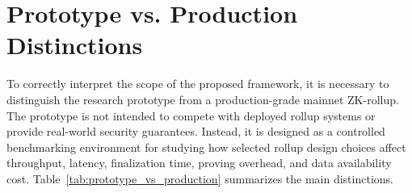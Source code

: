 

\section{Prototype vs. Production Distinctions}
\label{sec:prototype_vs_production}

To correctly interpret the scope of the proposed framework, it is necessary to distinguish the research prototype from a production-grade mainnet ZK-rollup. The prototype is not intended to compete with deployed rollup systems or provide real-world security guarantees. Instead, it is designed as a controlled benchmarking environment for studying how selected rollup design choices affect throughput, latency, finalization time, proving overhead, and data availability cost. Table~\ref{tab:prototype_vs_production} summarizes the main distinctions.

